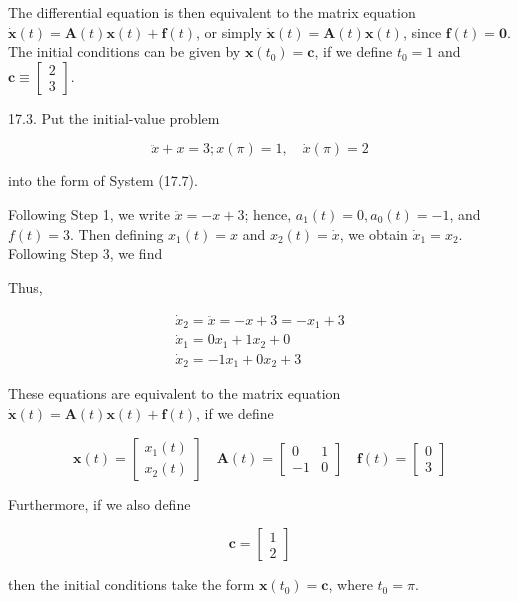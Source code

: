 \documentclass[10pt]{article}
\begin{document}
The differential equation is then equivalent to the matrix equation $\dot{\mathbf{x}}(t)=\mathbf{A}(t) \mathbf{x}(t)+\mathbf{f}(t)$, or simply $\dot{\mathbf{x}}(t)=\mathbf{A}(t) \mathbf{x}(t)$, since $\mathbf{f}(t)=\mathbf{0}$. The initial conditions can be given by $\mathbf{x}\left(t_{0}\right)=\mathbf{c}$, if we define $t_{0}=1$ and $\mathbf{c} \equiv\left[\begin{array}{l}2 \\ 3\end{array}\right]$.

17.3. Put the initial-value problem

$$
\ddot{x}+x=3 ; x(\pi)=1, \quad \dot{x}(\pi)=2
$$

into the form of System (17.7).

Following Step 1, we write $\ddot{x}=-x+3$; hence, $a_{1}(t)=0, a_{0}(t)=-1$, and $f(t)=3$. Then defining $x_{1}(t)=x$ and $x_{2}(t)=\dot{x}$, we obtain $\dot{x}_{1}=x_{2}$. Following Step 3, we find

Thus,

$$
\begin{gathered}
\dot{x}_{2}=\ddot{x}=-x+3=-x_{1}+3 \\
\dot{x}_{1}=0 x_{1}+1 x_{2}+0 \\
\dot{x}_{2}=-1 x_{1}+0 x_{2}+3
\end{gathered}
$$

These equations are equivalent to the matrix equation $\dot{\mathbf{x}}(t)=\mathbf{A}(t) \mathbf{x}(t)+\mathbf{f}(t)$, if we define

$$
\mathbf{x}(t)=\left[\begin{array}{l}
x_{1}(t) \\
x_{2}(t)
\end{array}\right] \quad \mathbf{A}(t)=\left[\begin{array}{rr}
0 & 1 \\
-1 & 0
\end{array}\right] \quad \mathbf{f}(t)=\left[\begin{array}{l}
0 \\
3
\end{array}\right]
$$

Furthermore, if we also define

$$
\mathbf{c}=\left[\begin{array}{l}
1 \\
2
\end{array}\right]
$$

then the initial conditions take the form $\mathbf{x}\left(t_{0}\right)=\mathbf{c}$, where $t_{0}=\pi$.
\end{document}

